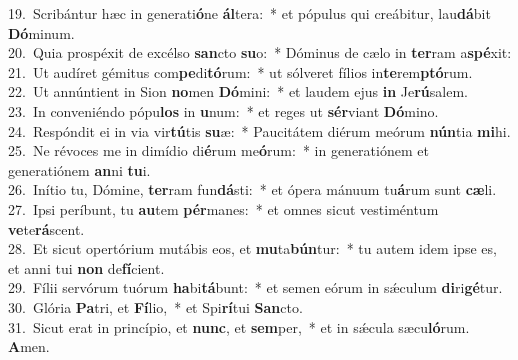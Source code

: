 {19.~}Scribántur hæc in generati\textbf{ó}ne \textbf{ál}tera:~* et pópulus qui creábitur, lau\textbf{dá}bit \textbf{Dó}minum.\\
{20.~}Quia prospéxit de excélso \textbf{san}cto \textbf{su}o:~* Dóminus de cælo in \textbf{ter}ram a\textbf{spé}xit:\\
{21.~}Ut audíret gémitus com\textbf{pe}di\textbf{tó}rum:~* ut sólveret fílios in\textbf{te}rem\textbf{ptó}rum.\\
{22.~}Ut annúntient in Sion \textbf{no}men \textbf{Dó}mini:~* et laudem ejus \textbf{in} Je\textbf{rú}salem.\\
{23.~}In conveniéndo pópu\textbf{los} in \textbf{u}num:~* et reges ut \textbf{sér}viant \textbf{Dó}mino.\\
{24.~}Respóndit ei in via vir\textbf{tú}tis \textbf{su}æ:~* Paucitátem diérum meórum \textbf{nún}tia \textbf{mi}hi.\\
{25.~}Ne révoces me in dimídio di\textbf{é}rum me\textbf{ó}rum:~* in generatiónem et generatiónem \textbf{an}ni \textbf{tu}i.\\
{26.~}Inítio tu, Dómine, \textbf{ter}ram fun\textbf{dá}sti:~* et ópera mánuum tu\textbf{á}rum sunt \textbf{cæ}li.\\
{27.~}Ipsi períbunt, tu \textbf{au}tem \textbf{pér}manes:~* et omnes sicut vestiméntum \textbf{ve}te\textbf{rá}scent.\\
{28.~}Et sicut opertórium mutábis eos, et \textbf{mu}ta\textbf{bún}tur:~* tu autem idem ipse es, et anni tui \textbf{non} de\textbf{fí}cient.\\
{29.~}Fílii servórum tuórum \textbf{ha}bi\textbf{tá}bunt:~* et semen eórum in sǽculum \textbf{di}ri\textbf{gé}tur.\\
{30.~}Glória \textbf{Pa}tri, et \textbf{Fí}lio,~* et Spi\textbf{rí}tui \textbf{San}cto.\\
{31.~}Sicut erat in princípio, et \textbf{nunc}, et \textbf{sem}per,~* et in sǽcula sæcu\textbf{ló}rum. \textbf{A}men.\\
